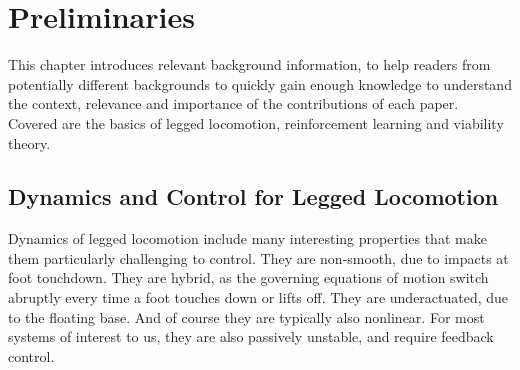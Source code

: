 
\chapter{Preliminaries} \label{chap:prelims}
This chapter introduces relevant background information, to help readers from potentially different backgrounds to quickly gain enough knowledge to understand the context, relevance and importance of the contributions of each paper. Covered are the basics of legged locomotion, reinforcement learning and viability theory.

\section{Dynamics and Control for Legged Locomotion}
Dynamics of legged locomotion include many interesting properties that make them particularly challenging to control. They are non-smooth, due to impacts at foot touchdown. They are hybrid, as the governing equations of motion switch abruptly every time a foot touches down or lifts off. They are underactuated, due to the floating base. And of course they are typically also nonlinear. For most systems of interest to us, they are also passively unstable, and require feedback control. \par

